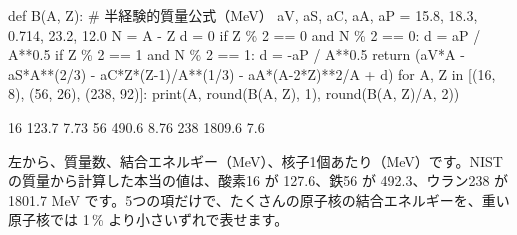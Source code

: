 \begin{phcode}[Python]
def B(A, Z):    \# 半経験的質量公式（MeV）
    aV, aS, aC, aA, aP = 15.8, 18.3, 0.714, 23.2, 12.0
    N = A - Z
    d = 0
    if Z \% 2 == 0 and N \% 2 == 0: d = aP / A**0.5
    if Z \% 2 == 1 and N \% 2 == 1: d = -aP / A**0.5
    return (aV*A - aS*A**(2/3) - aC*Z*(Z-1)/A**(1/3)
            - aA*(A-2*Z)**2/A + d)
for A, Z in [(16, 8), (56, 26), (238, 92)]:
    print(A, round(B(A, Z), 1), round(B(A, Z)/A, 2))
\end{phcode}
\begin{phcodeout}[実行結果]
16 123.7 7.73
56 490.6 8.76
238 1809.6 7.6
\end{phcodeout}
左から、質量数、結合エネルギー（MeV）、核子1個あたり（MeV）です。NIST の質量から計算した本当の値は、酸素16 が 127.6、鉄56 が 492.3、ウラン238 が 1801.7 MeV です。5つの項だけで、たくさんの原子核の結合エネルギーを、重い原子核では 1\,\% より小さいずれで表せます。

\begin{phmodel}[液滴模型]
\end{phmodel}

